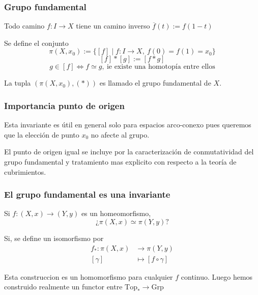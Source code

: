 \documentclass[xetex,mathserif,serif]{beamer}
\begin{document}
  \begin{frame}
    \frametitle{Grupo fundamental}
    \begin{block}{}
      Todo camino \(f : I \to X\) tiene un camino inverso \(\overline f (t)
      := f( 1 - t)\)
    \end{block}
    \begin{block}{}
      Se define el conjunto
      \[ \pi (X, x_0) := \{ [f] \mid f : I \to X ,\ f(0) = f(1) = x_0
        \} \]
      \[ [f] * [g] := [f * g]\]
      \[ g \in [f] \iff f \simeq g ,\ \text{ie existe una homotopía
          entre ellos}\]
    \end{block}

    \begin{block}{}
      La tupla \(
      \left(\pi(X, x_0), (*) \right) \) es llamado el grupo fundamental de \(X\).
    \end{block}
  \end{frame}

  \begin{frame}
    \frametitle{Importancia punto de origen}
    \begin{block}{}
      Esta invariante es útil en general solo para espacios arco-conexo
      pues queremos que la elección de punto \(x_0\) no afecte al grupo.
    \end{block}

    \pause

    \begin{block}{}
      El punto de origen igual se incluye por la caracterización de
      conmutatividad del grupo fundamental y tratamiento mas explicito con
      respecto a la teoría de cubrimientos.
    \end{block}
  \end{frame}

  \begin{frame}
    \frametitle{El grupo fundamental es una invariante}
    Si \(f : (X, x) \to (Y, y) \) es un homeomorfismo, \[¿\pi (X, x)
    \simeq \pi (Y,y)?\]

    \pause

    Si, se define un isomorfismo por
    \begin{align*}
      f_* : \pi (X,x) &\to \pi (Y, y) \\
      [\gamma] &\longmapsto [ f \circ \gamma ]
    \end{align*}

    \pause

    Esta construccion es un homomorfismo para cualquier \(f\) continuo.
    Luego hemos construido realmente un functor entre \(\text{Top}_*
    \to \text{Grp}\)
  \end{frame}
\end{document}
